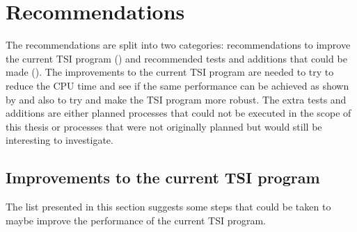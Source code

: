 \section{Recommendations}
\label{sec:recommendations}
The recommendations are split into two categories: recommendations to improve the current \ac{TSI} program () and recommended tests and additions that could be made (). The improvements to the current \ac{TSI} program are needed to try to reduce the CPU time and see if the same performance can be achieved as shown by \cite{scott2008high,bergsma2016application} and also to try and make the \ac{TSI} program more robust. The extra tests and additions are either planned processes that could not be executed in the scope of this thesis or processes that were not originally planned but would still be interesting to investigate.

\subsection{Improvements to the current \ac{TSI} program}
\label{subsec:improvementsToTheCurrentTSIprogram}
The list presented in this section suggests some steps that could be taken to maybe improve the performance of the current \ac{TSI} program. 

